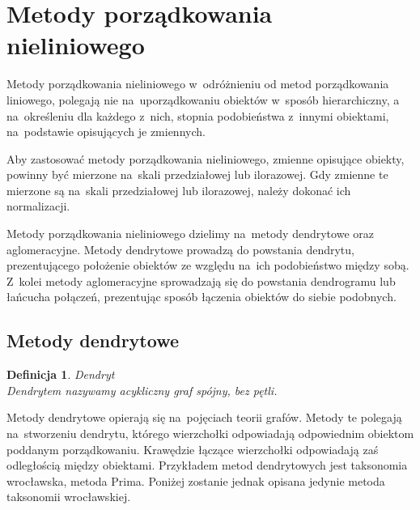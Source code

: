 \documentclass[12pt,a4paper]{report}
\newtheorem{definition}[theorem]{Definicja}
\begin{document}
\section{Metody porządkowania nieliniowego}


Metody porządkowania nieliniowego w~odróżnieniu od metod porządkowania liniowego, polegają nie na~uporządkowaniu obiektów w~sposób hierarchiczny, a na~określeniu dla każdego z~nich, stopnia podobieństwa z~innymi obiektami, na~podstawie opisujących je zmiennych. 

Aby zastosować metody porządkowania nieliniowego, zmienne opisujące obiekty, powinny być mierzone na~skali przedziałowej lub ilorazowej. Gdy zmienne te mierzone są na~skali przedziałowej lub ilorazowej, należy dokonać ich normalizacji.

Metody porządkowania nieliniowego dzielimy na~metody dendrytowe oraz aglomeracyjne. Metody dendrytowe prowadzą do powstania dendrytu, prezentującego położenie obiektów ze względu na~ich podobieństwo między sobą. Z~kolei metody aglomeracyjne sprowadzają się do powstania dendrogramu lub łańcucha połączeń, prezentując sposób łączenia obiektów do siebie podobnych. 

\subsection{Metody dendrytowe}

\begin{definition}{Dendryt \cite[Rozdział 2.3]{panek2013}}\\
Dendrytem nazywamy acykliczny graf spójny, bez pętli.
\end{definition}

Metody dendrytowe opierają się na~pojęciach teorii grafów. Metody te polegają na~stworzeniu dendrytu, którego wierzchołki odpowiadają odpowiednim obiektom poddanym porządkowaniu. Krawędzie łączące wierzchołki odpowiadają zaś odległością między obiektami. Przykładem metod dendrytowych jest taksonomia wrocławska, metoda Prima.   Poniżej zostanie jednak opisana jedynie metoda taksonomii wrocławskiej.  
\end{document}
